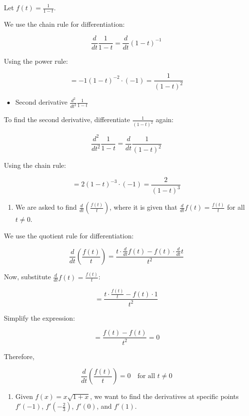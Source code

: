 \documentclass[
]{book}
\providecommand{\tightlist}{%
  \setlength{\itemsep}{0pt}\setlength{\parskip}{0pt}}
\begin{document}
Let \(f(t) = \frac{1}{1-t}\).

We use the chain rule for differentiation:

\[
\frac{d}{dt} \frac{1}{1-t} = \frac{d}{dt} (1-t)^{-1}
\]

Using the power rule:

\[
= -1(1-t)^{-2} \cdot (-1) = \frac{1}{(1-t)^2}
\]

\begin{itemize}
\tightlist
\item
  Second derivative \(\frac{d^2}{dt^2} \frac{1}{1-t}\)
\end{itemize}

To find the second derivative, differentiate \(\frac{1}{(1-t)^2}\)
again:

\[
\frac{d^2}{dt^2} \frac{1}{1-t} = \frac{d}{dt} \frac{1}{(1-t)^2}
\]

Using the chain rule:

\[
= 2(1-t)^{-3} \cdot (-1) = \frac{2}{(1-t)^3}
\]

\begin{enumerate}
\def\labelenumi{\arabic{enumi}.}
\setcounter{enumi}{3}
\tightlist
\item
  We are asked to find \(\frac{d}{dt} \left( \frac{f(t)}{t} \right)\),
  where it is given that \(\frac{d}{dt} f(t) = \frac{f(t)}{t}\) for all
  \(t \neq 0\).
\end{enumerate}

We use the quotient rule for differentiation:

\[
\frac{d}{dt} \left( \frac{f(t)}{t} \right) = \frac{t \cdot \frac{d}{dt} f(t) - f(t) \cdot \frac{d}{dt} t}{t^2}
\]

Now, substitute \(\frac{d}{dt} f(t) = \frac{f(t)}{t}\):

\[
= \frac{t \cdot \frac{f(t)}{t} - f(t) \cdot 1}{t^2}
\]

Simplify the expression:

\[
= \frac{f(t) - f(t)}{t^2} = 0
\]

Therefore,

\[
\frac{d}{dt} \left( \frac{f(t)}{t} \right) = 0 \quad \text{for all } t \neq 0
\]

\begin{enumerate}
\def\labelenumi{\arabic{enumi}.}
\setcounter{enumi}{4}
\tightlist
\item
  Given \(f(x) = x\sqrt{1+x}\), we want to find the derivatives at
  specific points \(f'(-1)\), \(f'(-\frac{2}{3})\), \(f'(0)\), and
  \(f'(1)\).
\end{enumerate}
\end{document}
